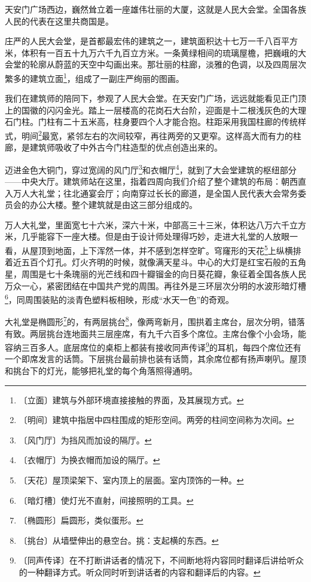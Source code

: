 \documentclass[12pt,UTF-8,openany]{ctexbook}
\begin{document}
\begin{normalsize}
    
    天安门广场西边，巍然耸立着一座雄伟壮丽的大厦，这就是人民大会堂。全国各族人民的代表在这里共商国是。
    
    庄严的人民大会堂，是首都最宏伟的建筑之一，建筑面积达十七万一千八百平方米，体积有一百五十九万六千九百立方米。一条黄绿相间的琉璃屋檐，把巍峨的大会堂的轮廓从蔚蓝的天空中勾画出来。那壮丽的柱廊，淡雅的色调，以及四周层次繁多的建筑立面\footnote{〔立面〕建筑与外部环境直接接触的界面，及其展现方式。}，组成了一副庄严绚丽的图画。
    
    我们在建筑师的陪同下，参观了人民大会堂。在天安门广场，远远就能看见正门顶上的国徽的闪闪金光。踏上一层楼高的花岗石大台阶，迎面是十二根浅灰色的大理石门柱。门柱有二十五米高，柱身要四个人才能合抱。柱距采用我国柱廊的传统样式，明间\footnote{〔明间〕建筑中指居中四柱围成的矩形空间。两旁的柱间空间称为次间。}最宽，紧邻左右的次间较窄，再往两旁的又更窄。这样高大而有力的柱廊，是建筑师吸收了中外古今门柱造型的优点创造出来的。
    
    迈进金色大铜门，穿过宽阔的风门厅\footnote{〔风门厅〕为挡风而加设的隔厅。}和衣帽厅\footnote{〔衣帽厅〕为换衣帽而加设的隔厅。}，就到了大会堂建筑的枢纽部分——中央大厅。建筑师站在这里，指着四周向我们介绍了整个建筑的布局：朝西直入万人大礼堂；往北通宴会厅；向南穿过长长的廊道，是全国人民代表大会常务委员会的办公大楼。整个建筑就是由这三部分组成的。
    
    万人大礼堂，里面宽七十六米，深六十米，中部高三十三米，体积达八万六千立方米，几乎能容下一座大楼。但是由于设计师处理得巧妙，走进大礼堂的人放眼一看，从屋顶到地面，上下浑然一体，并不感到怎样空旷。穹窿形的天花\footnote{〔天花〕屋顶梁架下、室内顶上的层面。室内顶饰的一种。}上纵横排着近五百个灯孔。灯火齐明的时候，就像满天星斗。中心的大灯是红宝石般的五角星，周围是七十条瑰丽的光芒线和四十瓣镏金的向日葵花瓣，象征着全国各族人民万众一心，紧密团结在中国共产党的周围。再往外是三环层次分明的水波形暗灯槽\footnote{〔暗灯槽〕使灯光不直射，间接照明的工具。}，同周围装贴的淡青色塑料板相映，形成“水天一色”的奇观。
    
    大礼堂是椭圆形\footnote{〔椭圆形〕扁圆形，类似蛋形。}的，有两层挑台\footnote{〔挑台〕从墙壁伸出的悬空台。挑：支起横的东西。}，像两弯新月，围拱着主席台，层次分明，错落有致。两层挑台连地面共三层座席，有九千六百多个席位。主席台像个小会场，能容纳三百多人。底层席位的桌柜上都装有接收同声传译\footnote{〔同声传译〕在不打断讲话者的情况下，不间断地将内容同时翻译后讲给听众的一种翻译方式。听众同时听到讲话者的内容和翻译后的内容。}的耳机，每四个席位还有一个即席发言的话筒。下层挑台最前排也装有话筒，其余席位都有扬声喇叭。屋顶和挑台下的灯光，能够把礼堂的每个角落照得通明。
    

\end{normalsize}
\end{document}
